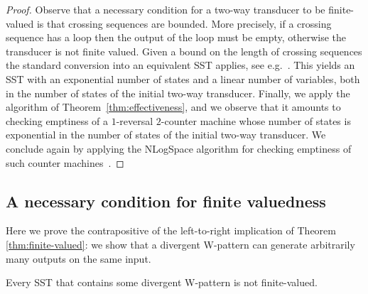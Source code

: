 \documentclass{article}
\begin{document}
    \begin{proof}
      Observe that a necessary condition for a two-way transducer to
      be finite-valued is that crossing sequences are bounded.
      More precisely, if a crossing sequence has a loop then the
      output of the loop must be empty, otherwise the transducer is
      not finite valued.
      Given a bound on the length of crossing sequences the standard
      conversion into an equivalent SST applies, see
      e.g.~\cite{ledent13,DBLP:journals/ijfcs/DartoisJR18}. This
      yields an SST with an exponential number of states and a linear
      number of variables, both in the number of
      states of the initial two-way
      transducer. Finally, we apply the algorithm of
      Theorem~\ref{thm:effectiveness}, and we observe that it amounts
      to checking emptiness of a $1$-reversal $2$-counter machine
      whose number of states is exponential in the number of states of
      the initial two-way transducer. We  conclude again by applying the
      {\upshape\sc NLogSpace} algorithm for checking emptiness of such
      counter machines~\cite{DBLP:journals/jcss/GurariI81}. 
    \end{proof}



\subsection{A necessary condition for finite valuedness}\label{subsec:left-to-right}

Here we prove the contrapositive of the left-to-right
implication of Theorem \ref{thm:finite-valued}:
we show that a
divergent W-pattern can generate arbitrarily
many outputs on the same input.

\begin{lemma}\label{lem:unbounded-values1}
Every SST that contains some divergent W-pattern is not finite-valued.
\end{lemma}
\end{document}
